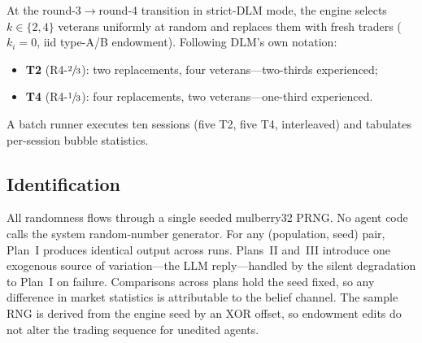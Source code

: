 At the round-3$\to$round-4 transition in strict-DLM mode, the engine
selects $k\in\{2,4\}$ veterans uniformly at random and replaces them
with fresh traders ($k_i{=}0$, iid type-A/B endowment).  Following
DLM's own notation:
\begin{itemize}[nosep]
\item \textbf{T2} (R4-$\sfrac{2}{3}$): two replacements, four
  veterans---two-thirds experienced;
\item \textbf{T4} (R4-$\sfrac{1}{3}$): four replacements, two
  veterans---one-third experienced.
\end{itemize}
A batch runner executes ten sessions (five T2, five T4, interleaved)
and tabulates per-session bubble statistics.

\subsection{Identification}

All randomness flows through a single seeded mulberry32 PRNG.  No
agent code calls the system random-number generator.  For any
(population, seed) pair, Plan~I produces identical output across
runs.  Plans~II and~III introduce one exogenous source of
variation---the LLM reply---handled by the silent degradation to
Plan~I on failure.  Comparisons across plans hold the seed fixed, so
any difference in market statistics is attributable to the belief
channel.  The sample RNG is derived from the engine seed by an XOR
offset, so endowment edits do not alter the trading sequence for
unedited agents.
